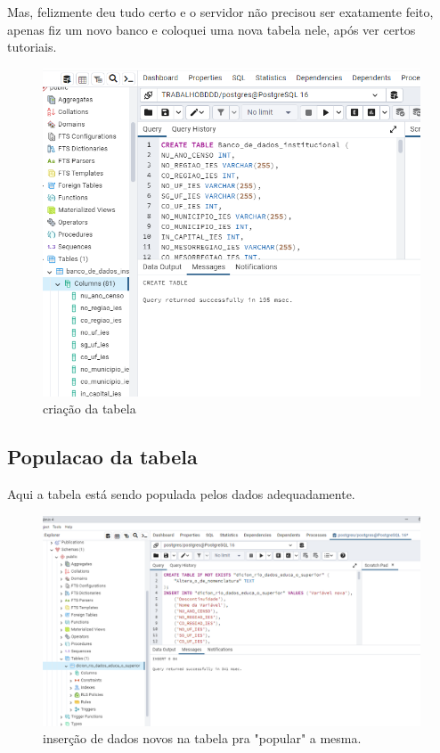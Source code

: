 \documentclass[12pt]{article}
\begin{document}
Mas, felizmente deu tudo certo e o servidor não precisou ser exatamente feito, apenas fiz um novo banco e coloquei uma nova tabela nele, após ver certos tutoriais.

\begin{figure}[h!]
\centering
\includegraphics[width=1\textwidth]{tabela criada genuinamente 2.PNG}
\caption{criação da tabela}
\end{figure}

\subsection{Populacao da tabela}
Aqui a tabela está sendo populada pelos dados adequadamente.
\cite{PostgreSQL}
\begin{figure}[h!]
\centering
\includegraphics[width=1\textwidth]{tabela criada, dados colocados 1.PNG}
\caption{inserção de dados novos na tabela pra "popular" a mesma.}
\end{figure}
\end{document}

